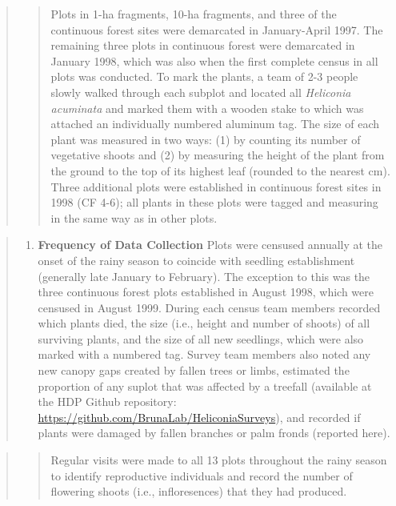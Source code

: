 \documentclass[
  12pt,
  man, donotrepeattitle]{apa6}
\providecommand{\tightlist}{%
  \setlength{\itemsep}{0pt}\setlength{\parskip}{0pt}}
\begin{document}
\begin{quote}
\begin{quote}
Plots in 1-ha fragments, 10-ha fragments, and three of the continuous forest sites were demarcated in January-April 1997. The remaining three plots in continuous forest were demarcated in January 1998, which was also when the first complete census in all plots was conducted. To mark the plants, a team of 2-3 people slowly walked through each subplot and located all \emph{Heliconia acuminata} and marked them with a wooden stake to which was attached an individually numbered aluminum tag. The size of each plant was measured in two ways: (1) by counting its number of vegetative shoots and (2) by measuring the height of the plant from the ground to the top of its highest leaf (rounded to the nearest cm). Three additional plots were established in continuous forest sites in 1998 (CF 4-6); all plants in these plots were tagged and measuring in the same way as in other plots.
\end{quote}
\end{quote}

\begin{quote}
\begin{enumerate}
\def\labelenumi{\alph{enumi}.}
\setcounter{enumi}{3}
\tightlist
\item
  \textbf{Frequency of Data Collection} Plots were censused annually at the onset of the rainy season to coincide with seedling establishment (generally late January to February). The exception to this was the three continuous forest plots established in August 1998, which were censused in August 1999. During each census team members recorded which plants died, the size (i.e., height and number of shoots) of all surviving plants, and the size of all new seedlings, which were also marked with a numbered tag. Survey team members also noted any new canopy gaps created by fallen trees or limbs, estimated the proportion of any suplot that was affected by a treefall (available at the HDP Github repository: \url{https://github.com/BrunaLab/HeliconiaSurveys}), and recorded if plants were damaged by fallen branches or palm fronds (reported here).
\end{enumerate}
\end{quote}

\begin{quote}
\begin{quote}
Regular visits were made to all 13 plots throughout the rainy season to identify reproductive individuals and record the number of flowering shoots (i.e., infloresences) that they had produced.
\end{quote}
\end{quote}
\end{document}
